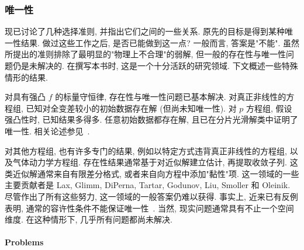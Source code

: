 \subsubsection{唯一性}\label{subsec:conservation-uniqueness}

现已讨论了几种选择准则, 并指出它们之间的一些关系. 原先的目标是得到某种唯一性结果. 做过这些工作之后, 是否已能做到这一点? 一般而言, 答案是"不能". 虽然所提出的准则排除了最明显的"物理上不合理"的弱解, 但一般的存在性与唯一性问题仍是未解决的. 在撰写本书时, 这是一个十分活跃的研究领域. 下文概述一些特殊情形的结果.

对具有强凸 $f$ 的标量守恒律, 存在性与唯一性问题已基本解决. 对真正非线性的方程组, 已知对全变差较小的初始数据存在解 (但尚未知唯一性). 对 $p$ 方程组, 假设强凸性时, 已知结果多得多. 任意初始数据都存在解, 且已在分片光滑解类中证明了唯一性. 相关论述参见~\cite{Sm}.

对其他方程组, 也有许多专门的结果, 例如以特定方式违背真正非线性的方程组, 以及气体动力学方程组. 存在性结果通常基于对近似解建立估计, 再提取收敛子列. 这类近似解通常来自有限差分格式, 或者来自向方程中添加"黏性"项. 这一领域的一些主要贡献者是 Lax, Glimm, DiPerna, Tartar, Godunov, Liu, Smoller 和 Oleinik. 尽管作出了所有这些努力, 这一领域的一般答案仍难以获得. 事实上, 近来已有反例表明, 通常的容许性条件不能保证唯一性~\cite{Se}. 当然, 现实问题通常具有不止一个空间维度. 在这种情形下, 几乎所有问题都尚未解决.

\paragraph*{Problems}

